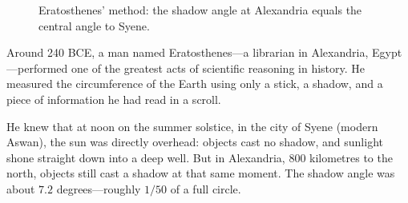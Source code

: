 \documentclass[12pt, a4paper, twoside]{book}
\theoremstyle{disc}
\begin{document}
\begin{figure}
\centering
{}
\caption{Eratosthenes' method: the shadow angle at Alexandria equals the central angle to Syene.}
\label{fig:eratosthenes}
\end{figure}

Around 240 BCE, a man named Eratosthenes---a librarian in Alexandria, Egypt---performed one of the greatest acts of scientific reasoning in history. He measured the circumference of the Earth using only a stick, a shadow, and a piece of information he had read in a scroll.

He knew that at noon on the summer solstice, in the city of Syene (modern Aswan), the sun was directly overhead: objects cast no shadow, and sunlight shone straight down into a deep well. But in Alexandria, 800 kilometres to the north, objects still cast a shadow at that same moment. The shadow angle was about $7.2$ degrees---roughly $1/50$ of a full circle.
\end{document}
